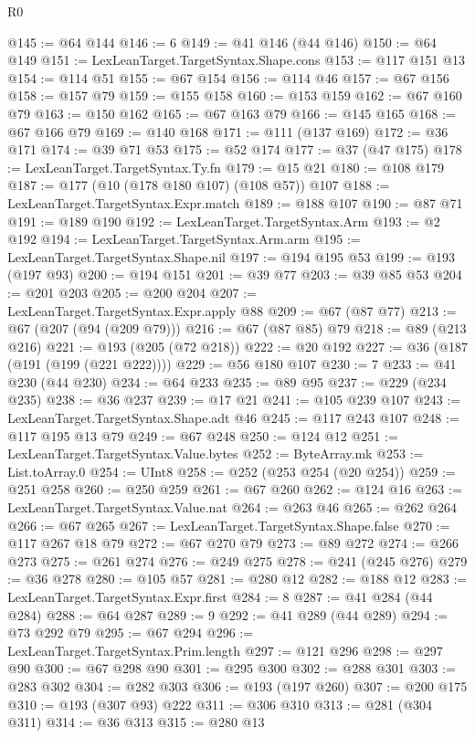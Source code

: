 \begin{lexlean}{R0}
\begin{coremodule}
@145 := @64 @144
@146 := 6
@149 := @41 @146 (@44 @146)
@150 := @64 @149
@151 := LexLeanTarget.TargetSyntax.Shape.cons
@153 := @117 @151 @13
@154 := @114 @51
@155 := @67 @154
@156 := @114 @46
@157 := @67 @156
@158 := @157 @79
@159 := @155 @158
@160 := @153 @159
@162 := @67 @160 @79
@163 := @150 @162
@165 := @67 @163 @79
@166 := @145 @165
@168 := @67 @166 @79
@169 := @140 @168
@171 := @111 (@137 @169)
@172 := @36 @171
@174 := @39 @71 @53
@175 := @52 @174
@177 := @37 (@47 @175)
@178 := LexLeanTarget.TargetSyntax.Ty.fn
@179 := @15 @21
@180 := @108 @179
@187 := @177 (@10 (@178 @180 @107) (@108 @57)) @107
@188 := LexLeanTarget.TargetSyntax.Expr.match
@189 := @188 @107
@190 := @87 @71
@191 := @189 @190
@192 := LexLeanTarget.TargetSyntax.Arm
@193 := @2 @192
@194 := LexLeanTarget.TargetSyntax.Arm.arm
@195 := LexLeanTarget.TargetSyntax.Shape.nil
@197 := @194 @195 @53
@199 := @193 (@197 @93)
@200 := @194 @151
@201 := @39 @77
@203 := @39 @85 @53
@204 := @201 @203
@205 := @200 @204
@207 := LexLeanTarget.TargetSyntax.Expr.apply @88
@209 := @67 (@87 @77)
@213 := @67 (@207 (@94 (@209 @79)))
@216 := @67 (@87 @85) @79
@218 := @89 (@213 @216)
@221 := @193 (@205 (@72 @218))
@222 := @20 @192
@227 := @36 (@187 (@191 (@199 (@221 @222))))
@229 := @56 @180 @107
@230 := 7
@233 := @41 @230 (@44 @230)
@234 := @64 @233
@235 := @89 @95
@237 := @229 (@234 @235)
@238 := @36 @237
@239 := @17 @21
@241 := @105 @239 @107
@243 := LexLeanTarget.TargetSyntax.Shape.adt @46
@245 := @117 @243 @107
@248 := @117 @195 @13 @79
@249 := @67 @248
@250 := @124 @12
@251 := LexLeanTarget.TargetSyntax.Value.bytes
@252 := ByteArray.mk
@253 := List.toArray.{0}
@254 := UInt8
@258 := @252 (@253 @254 (@20 @254))
@259 := @251 @258
@260 := @250 @259
@261 := @67 @260
@262 := @124 @16
@263 := LexLeanTarget.TargetSyntax.Value.nat
@264 := @263 @46
@265 := @262 @264
@266 := @67 @265
@267 := LexLeanTarget.TargetSyntax.Shape.false
@270 := @117 @267 @18 @79
@272 := @67 @270 @79
@273 := @89 @272
@274 := @266 @273
@275 := @261 @274
@276 := @249 @275
@278 := @241 (@245 @276)
@279 := @36 @278
@280 := @105 @57
@281 := @280 @12
@282 := @188 @12
@283 := LexLeanTarget.TargetSyntax.Expr.first
@284 := 8
@287 := @41 @284 (@44 @284)
@288 := @64 @287
@289 := 9
@292 := @41 @289 (@44 @289)
@294 := @73 @292 @79
@295 := @67 @294
@296 := LexLeanTarget.TargetSyntax.Prim.length
@297 := @121 @296
@298 := @297 @90
@300 := @67 @298 @90
@301 := @295 @300
@302 := @288 @301
@303 := @283 @302
@304 := @282 @303
@306 := @193 (@197 @260)
@307 := @200 @175
@310 := @193 (@307 @93) @222
@311 := @306 @310
@313 := @281 (@304 @311)
@314 := @36 @313
@315 := @280 @13

\end{coremodule}
\end{lexlean}
